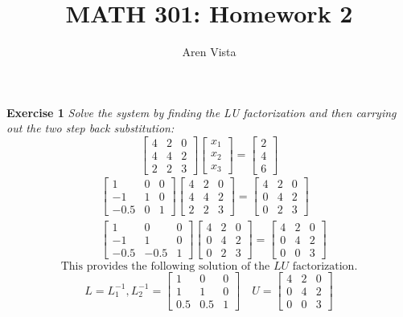 \documentclass[9pt]{article}
\title{ MATH 301: Homework 2}
\author{ Aren Vista }
\theoremstyle{plain}
\begin{document}
\maketitle
\noindent \textbf{Exercise 1} \textit{Solve the system by finding the LU factorization and then carrying out the two step back substitution:}
\[
	\begin{bmatrix}
		4 & 2 & 0 \\
		4 & 4 & 2 \\
		2 & 2 & 3
	\end{bmatrix}
	\begin{bmatrix} x_1 \\ x_2 \\ x_3 \end{bmatrix} = \begin{bmatrix} 2 \\ 4 \\ 6 \end{bmatrix}
\]
\[
	\begin{aligned}
		 & \begin{bmatrix}
			   1    & 0 & 0 \\
			   -1   & 1 & 0 \\
			   -0.5 & 0 & 1
		   \end{bmatrix}
		\begin{bmatrix}
			4 & 2 & 0 \\
			4 & 4 & 2 \\
			2 & 2 & 3
		\end{bmatrix} =
		\begin{bmatrix}
			4 & 2 & 0 \\
			0 & 4 & 2 \\
			0 & 2 & 3
		\end{bmatrix}
		\\
		 & \begin{bmatrix}
			   1    & 0    & 0 \\
			   -1   & 1    & 0 \\
			   -0.5 & -0.5 & 1
		   \end{bmatrix}
		\begin{bmatrix}
			4 & 2 & 0 \\
			0 & 4 & 2 \\
			0 & 2 & 3
		\end{bmatrix} =
		\begin{bmatrix}
			4 & 2 & 0 \\
			0 & 4 & 2 \\
			0 & 0 & 3
		\end{bmatrix}
	\end{aligned}
\]
\[
	\text{This provides the following solution of the $LU$ factorization.}
\]
\[
	L = L_1^{-1}, L_2^{-1} =
	\begin{bmatrix}
		1   & 0   & 0 \\
		1   & 1   & 0 \\
		0.5 & 0.5 & 1
	\end{bmatrix}
	\quad
	U =
	\begin{bmatrix}
		4 & 2 & 0 \\
		0 & 4 & 2 \\
		0 & 0 & 3
	\end{bmatrix}
\]
\end{document}
